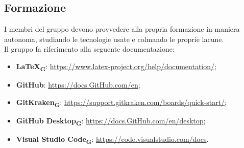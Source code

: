 \subsection{Formazione}
I membri del gruppo devono provvedere alla propria formazione in maniera autonoma, studiando le tecnologie usate e colmando le proprie lacune.\\
Il gruppo fa riferimento alla seguente documentazione:
\begin{itemize}
    \item \textbf{\LaTeX\textsubscript{\textbf{G}}}: \url{https://www.latex-project.org/help/documentation/};
    \item \textbf{GitHub}: \url{https://docs.GitHub.com/en};
    \item \textbf{GitKraken\textsubscript{\textbf{G}}}: \url{https://support.gitkraken.com/boards/quick-start/};
    \item \textbf{GitHub Desktop\textsubscript{\textbf{G}}}: \url{https://docs.GitHub.com/en/desktop};
    \item \textbf{Visual Studio Code}\textsubscript{\textbf{G}}: \url{https://code.visualstudio.com/docs}.
\end{itemize}